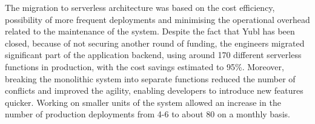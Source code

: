The migration to serverless architecture was based on the cost efficiency, possibility of more frequent deployments and minimising the operational overhead related to the maintenance of the system.
Despite the fact that Yubl has been closed, because of not securing another round of funding, the engineers migrated significant part of the application backend, using around 170 different serverless functions in production, with the cost savings estimated to 95\%.
Moreover, breaking the monolithic system into separate functions reduced the number of conflicts and improved the agility, enabling developers to introduce new features quicker.
Working on smaller units of the system allowed an increase in the number of production deployments from 4-6 to about 80 on a monthly basis.





